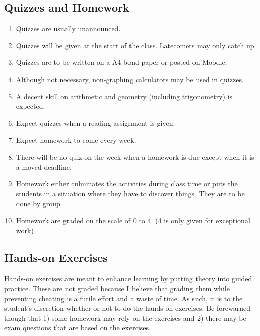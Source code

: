 \documentclass[10pt]{article}
\begin{document}
\subsection{Quizzes and Homework}
\begin{enumerate}[noitemsep]
\item Quizzes are usually unannounced.
\item Quizzes will be given at the start of the class. Latecomers may only catch up.
\item Quizzes are to be written on a A4 bond paper or posted on Moodle.
\item Although not necessary, non-graphing calculators may be used in quizzes.
\item A decent skill on arithmetic and geometry (including trigonometry) is expected.
\item Expect quizzes when a reading assignment is given.
\item Expect homework to come every week.
\item There will be no quiz on the week when a homework is due except when it is a moved deadline.
\item Homework either culminates the activities during class time or puts the students in a situation where they have to discover things. They are to be done by group.
\item Homework are graded on the scale of 0 to 4. (4 is only given for exceptional work)
\end{enumerate}

\subsection{Hands-on Exercises}
Hands-on exercises are meant to enhance learning by putting theory into guided practice. These are not graded because I believe that grading them while preventing cheating is a futile effort and a waste of time. As such, it is to the student's discretion whether or not to do the hands-on exercises. Be forewarned though that 1) some homework may rely on the exercises and 2) there may be exam questions that are based on the exercises.
\end{document}
